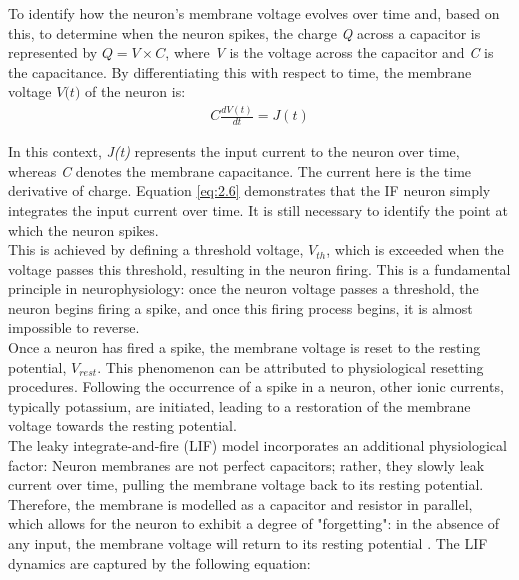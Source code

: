 \noindent To identify how the neuron's membrane voltage evolves over time and, based on this, to determine when the neuron spikes, the charge \textit{Q} across a capacitor is represented by $Q = V \times C$, where \textit{V} is the voltage across the capacitor and \textit{C} is the capacitance. By differentiating this with respect to time, the membrane voltage $\textit{V(t)}$ of the neuron is:
\begin{align}
    C \frac{dV(t)}{dt} = J(t) \label{eq:2.6} 
\end{align}

\noindent In this context, \textit{J(t)} represents the input current to the neuron over time, whereas \textit{C} denotes the membrane capacitance. The current here is the time derivative of charge. Equation \ref{eq:2.6} demonstrates that the IF neuron simply integrates the input current over time. It is still necessary to identify the point at which the neuron spikes. \\

\noindent This is achieved by defining a threshold voltage, $V_{th}$, which is exceeded when the voltage passes this threshold, resulting in the neuron firing. This is a fundamental principle in neurophysiology: once the neuron voltage passes a threshold, the neuron begins firing a spike, and once this firing process begins, it is almost impossible to reverse. \\

\noindent Once a neuron has fired a spike, the membrane voltage is reset to the resting potential, $V_{rest}$. This phenomenon can be attributed to physiological resetting procedures. Following the occurrence of a spike in a neuron, other ionic currents, typically potassium, are initiated, leading to a restoration of the membrane voltage towards the resting potential.\\


\noindent The leaky integrate-and-fire (LIF) model \cite{knight1972dynamics} incorporates an additional physiological factor: Neuron membranes are not perfect capacitors; rather, they slowly leak current over time, pulling the membrane voltage back to its resting potential. Therefore, the membrane is modelled as a capacitor and resistor in parallel, which allows for the neuron to exhibit a degree of "forgetting": in the absence of any input, the membrane voltage will return to its resting potential \cite{koch2004biophysics}. The LIF dynamics are captured by the following equation:

